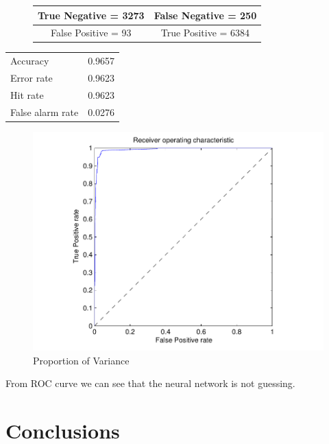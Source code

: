 \begin{figure}[h]
  \centering
  \begin{tabular}[h]{|c|c|}
    \hline
    True Negative = 3273 & False Negative = 250 \\
    \hline
    False Positive = 93 & True Positive = 6384\\
    \hline

  \end{tabular}

\end{figure}

\begin{center}
  \begin{tabular}[h]{ll}
    Accuracy & 0.9657 \\
    Error rate & 0.9623 \\
    Hit rate & 0.9623 \\
    False alarm rate & 0.0276
  \end{tabular}
\end{center}



\begin{figure}[h]
  \centering
  \includegraphics{roc}
  \caption{Proportion of Variance}
\end{figure}





From ROC curve we can see that the neural network is not guessing.

\clearpage
\section{Conclusions}
\label{sec:conclusions}

